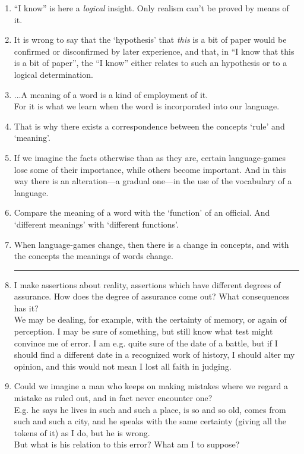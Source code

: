 \documentclass{book}
\begin{document}
\begin{enumerate}
\item
``I know'' is here a \emph{logical} insight. Only realism can't be proved by
means of it.

\item
It is wrong to say that the `hypothesis' that \emph{this} is a bit of paper
would be confirmed or disconfirmed by later experience, and that, in ``I know
that this is a bit of paper'', the ``I know'' either relates to such an
hypothesis or to a logical determination.

\item
...A meaning of a word is a kind of employment of it. \\
For it is what we learn when the word is incorporated into our language.

\item
That is why there exists a correspondence between the concepts `rule' and
`meaning'.

\item
If we imagine the facts otherwise than as they are, certain language-games lose
some of their importance, while others become important. And in this way there
is an alteration---a gradual one---in the use of the vocabulary of a language.

\item
Compare the meaning of a word with the `function' of an official. And
`different meanings' with `different functions'.

\item
When language-games change, then there is a change in concepts, and with the
concepts the meanings of words change.

\begin{center}\rule{0.5\linewidth}{\linethickness}\end{center}

\item
I make assertions about reality, assertions which have different degrees of
assurance. How does the degree of assurance come out? What consequences has it?
\\
We may be dealing, for example, with the certainty of memory, or again of
perception. I may be sure of something, but still know what test might convince
me of error. I am e.g. quite sure of the date of a battle, but if I should find
a different date in a recognized work of history, I should alter my opinion,
and this would not mean I lost all faith in judging.

\item
Could we imagine a man who keeps on making mistakes where we regard a mistake
as ruled out, and in fact never encounter one? \\
E.g. he says he lives in such and such a place, is so and so old, comes from
such and such a city, and he speaks with the same certainty (giving all the
tokens of it) as I do, but he is wrong. \\
But what is his relation to this error? What am I to suppose?


\end{enumerate}
\end{document}

